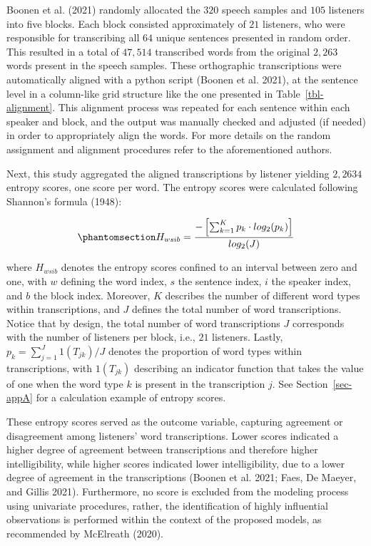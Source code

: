 \documentclass[
sn-apacite
]{sn-jnl}
\begin{document}
{Boonen et al. (2021) randomly allocated the \(320\) speech samples and
\(105\) listeners into five blocks. Each block consisted approximately
of \(21\) listeners, who were responsible for transcribing all \(64\)
unique sentences presented in random order.} This resulted in a total of
\(47,514\) transcribed words from the original \(2,263\) words present
in the speech samples. These orthographic transcriptions were
automatically aligned with a python script (Boonen et al. 2021), at the
sentence level in a column-like grid structure like the one presented in
Table~\ref{tbl-alignment}. This alignment process was repeated for each
sentence within each speaker and block, and the output was manually
checked and adjusted (if needed) in order to appropriately align the
words. {For more details on the random assignment and alignment
procedures refer to the aforementioned authors.}

Next, this study aggregated the aligned transcriptions by listener
yielding \(2,2634\) entropy scores, one score per word. The entropy
scores were calculated following Shannon's formula (1948):

\begin{equation}\phantomsection\label{eq-entropy}{
H_{wsib} = \frac{ -\left[ \sum_{k=1}^{K}  p_{k} \cdot log_{2}(p_{k}) \right] }{ log_{2}(J)}
}\end{equation}

where \(H_{wsib}\) denotes the entropy scores confined to an interval
between zero and one, with \(w\) defining the word index, \(s\) the
sentence index, \(i\) the speaker index, and \(b\) the block index.
Moreover, \(K\) describes the number of different word types within
transcriptions, and \(J\) defines the total number of word
transcriptions. Notice that by design, the total number of word
transcriptions \(J\) corresponds with the number of listeners per block,
i.e., \(21\) listeners. Lastly, \(p_{k} = \sum_{j=1}^{J} 1(T_{jk}) / J\)
denotes the proportion of word types within transcriptions, with
\(1(T_{jk})\) describing an indicator function that takes the value of
one when the word type \(k\) is present in the transcription \(j\). See
Section~\ref{sec-appA} for a calculation example of entropy scores.

These entropy scores served as the outcome variable, capturing agreement
or disagreement among listeners' word transcriptions. Lower scores
indicated a higher degree of agreement between transcriptions and
therefore higher intelligibility, while higher scores indicated lower
intelligibility, due to a lower degree of agreement in the
transcriptions (Boonen et al. 2021; Faes, De Maeyer, and Gillis 2021).
Furthermore, no score is excluded from the modeling process using
univariate procedures, rather, the identification of highly influential
observations is performed within the context of the proposed models, as
recommended by McElreath (2020).
\end{document}
